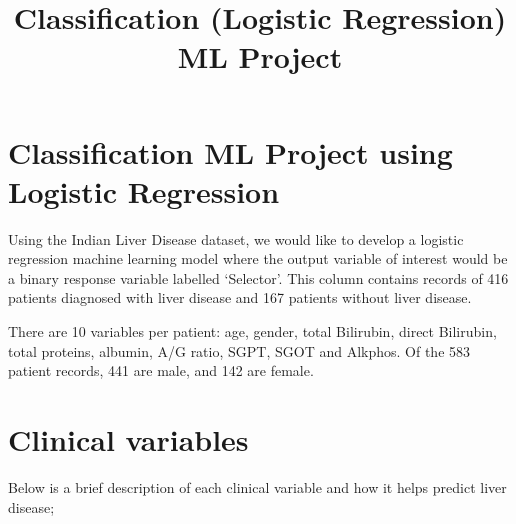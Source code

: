 \documentclass[11pt]{article}
\title{Classification (Logistic Regression) ML Project}
\begin{document}
    
    \maketitle
    
    

    
    \section*{Classification ML Project using Logistic
Regression}\label{classification-ml-project-using-logistic-regression}

    Using the Indian Liver Disease dataset, we would like to develop a
logistic regression machine learning model where the output variable of
interest would be a binary response variable labelled `Selector'. This
column contains records of 416 patients diagnosed with liver disease and
167 patients without liver disease.

There are 10 variables per patient: age, gender, total Bilirubin, direct
Bilirubin, total proteins, albumin, A/G ratio, SGPT, SGOT and Alkphos.
Of the 583 patient records, 441 are male, and 142 are female.

    \section{Clinical variables}\label{clinical-variables}

Below is a brief description of each clinical variable and how it helps
predict liver disease;
\end{document}
